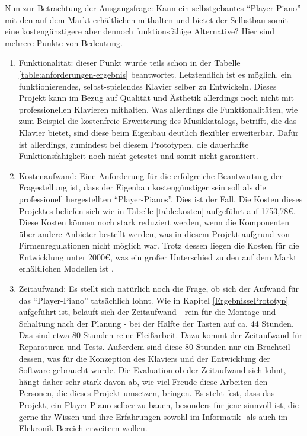 Nun zur Betrachtung der Ausgangsfrage: Kann ein selbstgebautes \enquote{Player-Piano} mit den
auf dem Markt erhältlichen mithalten und bietet der Selbstbau somit eine kostengünstigere aber dennoch funktionsfähige
Alternative? \newline
Hier sind mehrere Punkte von Bedeutung.
\begin{enumerate}
    \item Funktionalität: dieser Punkt wurde teils schon in der Tabelle \ref{table:anforderungen-ergebnis} beantwortet.
    Letztendlich ist es möglich, ein funktionierendes, selbst-spielendes Klavier selber zu Entwickeln. Dieses Projekt  kann im Bezug
    auf Qualität und Ästhetik allerdings noch nicht mit professionellen Klavieren mithalten.
    Was allerdings die Funktionalitäten, wie zum Beispiel die kostenfreie Erweiterung des Musikkatalogs, betrifft, die das Klavier bietet,
    sind diese beim Eigenbau deutlich flexibler erweiterbar.
    Dafür ist allerdings, zumindest bei diesem Prototypen, die dauerhafte Funktionsfähigkeit noch nicht getestet und somit nicht
    garantiert.
    \item Kostenaufwand: Eine Anforderung für die erfolgreiche Beantwortung der Fragestellung ist, dass der Eigenbau kostengünstiger
    sein soll als die professionell hergestellten \enquote{Player-Pianos}. Dies ist der Fall. Die Kosten dieses Projektes
    beliefen sich wie in Tabelle \ref{table:kosten} aufgeführt auf 1753,78\euro{}. Diese Kosten können noch stark reduziert
    werden, wenn die Komponenten über andere Anbieter bestellt werden, was in diesem Projekt aufgrund von Firmenregulationen
    nicht möglich war. Trotz dessen liegen die Kosten für die Entwicklung unter 2000\euro{}, was ein großer Unterschied
    zu den auf dem Markt erhältlichen Modellen ist \cite[vgl.][]{YamahaU1}.
    \item Zeitaufwand: Es stellt sich natürlich noch die Frage, ob sich der Aufwand für das \enquote{Player-Piano} tatsächlich
    lohnt. Wie in Kapitel \ref{ErgebnissePrototyp} aufgeführt ist, beläuft sich der Zeitaufwand - rein für die Montage und Schaltung
    nach der Planung - bei der Hälfte der Tasten auf ca. 44 Stunden. Das sind etwa 80 Stunden reine Fleißarbeit.
    Dazu kommt der Zeitaufwand für Reparaturen und Tests. Außerdem sind diese 80 Stunden nur ein Bruchteil dessen, was
    für die Konzeption des Klaviers und der Entwicklung der Software gebraucht wurde. Die Evaluation ob der Zeitaufwand
    sich lohnt, hängt daher sehr stark davon ab, wie viel Freude diese Arbeiten den Personen, die dieses Projekt
    umsetzen, bringen. Es steht fest, dass das Projekt, ein Player-Piano selber zu bauen, besonders für jene sinnvoll ist,
    die gerne ihr Wissen und ihre Erfahrungen sowohl im Informatik- als auch im Elekronik-Bereich erweitern wollen.
\end{enumerate}

